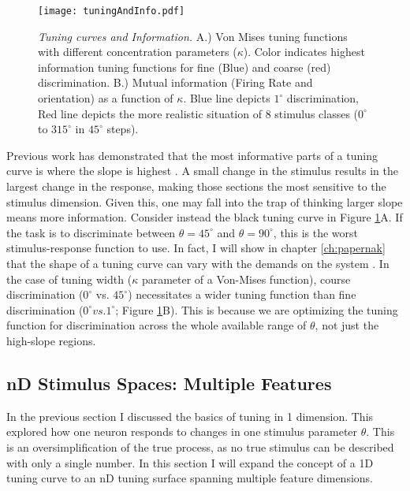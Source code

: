 \begin{figure}[h]
	\centerline{\texttt{[image: tuningAndInfo.pdf]}}
	\caption{\textit{Tuning curves and Information.} A.) Von Mises tuning functions with different concentration parameters ($\kappa$). Color indicates highest information tuning functions for fine (Blue) and coarse (red) discrimination. B.) Mutual information (Firing Rate and orientation) as a function of $\kappa$. Blue line depicts $1^\circ$ discrimination, Red line depicts the more realistic situation of 8 stimulus classes ($0^\circ$ to $315^\circ$ in $45^\circ$ steps). }
	\label{fig:tuningInfo}
\end{figure}

Previous work has demonstrated that the most informative parts of a tuning curve is where the slope is highest \parencite{Series2004}. A small change in the stimulus results in the largest change in the response, making those sections the most sensitive to the stimulus dimension. Given this, one may fall into the trap of thinking larger slope means more information. Consider instead the black tuning curve in Figure \ref{fig:tuningInfo}A. If the task is to discriminate between $\theta=45^\circ$ and $\theta=90^\circ$, this is the worst stimulus-response function to use. In fact, I will show in chapter \ref{ch:papernak} that the shape of a tuning curve can vary with the demands on the system \parencite{Scott2023}. In the case of tuning width ($\kappa$ parameter of a Von-Mises function), course discrimination ($0^\circ$ vs. $45^\circ$) necessitates a wider tuning function than fine discrimination ($0^\circ vs. 1^\circ$; Figure \ref{fig:tuningInfo}B). This is because we are optimizing the tuning function for discrimination across the whole available range of $\theta$, not just the high-slope regions. 



\subsection{nD Stimulus Spaces: Multiple Features}
In the previous section I discussed the basics of tuning in 1 dimension. This explored how one neuron responds to changes in one stimulus parameter $\theta$. This is an oversimplification of the true process, as no true stimulus can be described with only a single number. In this section I will expand the concept of a 1D tuning curve to an nD tuning surface spanning multiple feature dimensions. 

